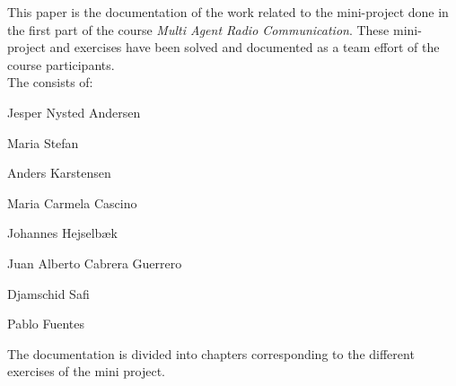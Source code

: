 This paper is the documentation of the work related to the mini-project done in the first part of the course \textit{Multi Agent Radio Communication}. These mini-project and exercises have been solved and documented as a team effort of the course participants.\\

The consists of:
	\begin{description}
	\item \hspace{4cm} Jesper Nysted Andersen
 	\item \hspace{4cm} Maria Stefan
 	\item \hspace{4cm} Anders Karstensen
 	\item \hspace{4cm} Maria Carmela Cascino
 	\item \hspace{4cm} Johannes Hejselbæk
 	\item \hspace{4cm} Juan Alberto Cabrera Guerrero
 	\item \hspace{4cm} Djamschid Safi
 	\item \hspace{4cm} Pablo Fuentes
	\end{description}

\vspace{2cm}
The documentation is divided into chapters corresponding to the different exercises of the mini project.